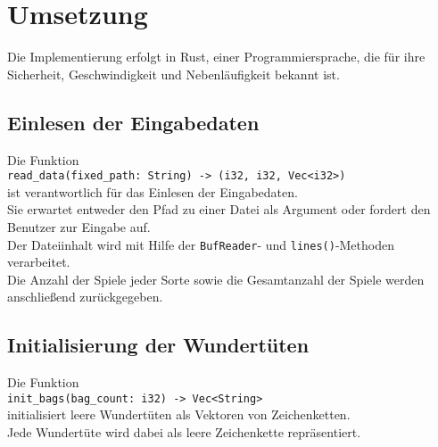 \section{Umsetzung}
Die Implementierung erfolgt in Rust, einer Programmiersprache, die für ihre Sicherheit, Geschwindigkeit und Nebenläufigkeit bekannt ist.

\subsection{Einlesen der Eingabedaten}
Die Funktion \\
\texttt{read\_data(fixed\_path: String) -> (i32, i32, Vec<i32>)} \\
ist verantwortlich für das Einlesen der Eingabedaten. \\
Sie erwartet entweder den Pfad zu einer Datei als Argument oder fordert den Benutzer zur Eingabe auf. \\
Der Dateiinhalt wird mit Hilfe der \texttt{BufReader}- und \texttt{lines()}-Methoden verarbeitet. \\
Die Anzahl der Spiele jeder Sorte sowie die Gesamtanzahl der Spiele werden anschließend zurückgegeben.\\

\subsection{Initialisierung der Wundertüten}
Die Funktion\\
\texttt{init\_bags(bag\_count: i32) -> Vec<String>}\\
initialisiert leere Wundertüten als Vektoren von Zeichenketten.\\
Jede Wundertüte wird dabei als leere Zeichenkette repräsentiert.\\

